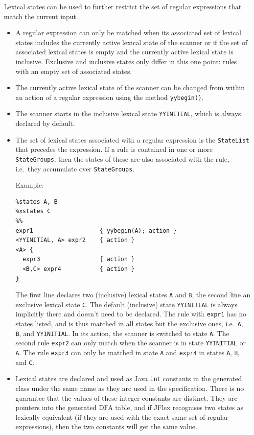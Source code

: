 Lexical states can be used to further restrict the set of regular
expressions that match the current input.

\begin{itemize}
\item
  A regular expression can only be matched when its associated set of
  lexical states includes the currently active lexical state of the
  scanner or if the set of associated lexical states is empty and the
  currently active lexical state is inclusive. Exclusive and inclusive
  states only differ in this one point: rules with an empty set of
  associated states.
\item
  The currently active lexical state of the scanner can be changed from
  within an action of a regular expression using the method
  \texttt{yybegin()}.
\item
  The scanner starts in the inclusive lexical state \texttt{YYINITIAL},
  which is always declared by default.
\item
  The set of lexical states associated with a regular expression is the
  \texttt{StateList} that precedes the expression. If a rule is
  contained in one or more \texttt{StateGroups}, then the states of
  these are also associated with the rule, i.e.~they accumulate over
  \texttt{StateGroups}.

  Example:

\begin{verbatim}
%states A, B
%xstates C
%%
expr1                   { yybegin(A); action }
<YYINITIAL, A> expr2    { action }
<A> {
  expr3                 { action }
  <B,C> expr4           { action }
}
\end{verbatim}

  The first line declares two (inclusive) lexical states \texttt{A} and
  \texttt{B}, the second line an exclusive lexical state \texttt{C}. The
  default (inclusive) state \texttt{YYINITIAL} is always implicitly
  there and doesn't need to be declared. The rule with \texttt{expr1}
  has no states listed, and is thus matched in all states but the
  exclusive ones, i.e.~\texttt{A}, \texttt{B}, and \texttt{YYINITIAL}.
  In its action, the scanner is switched to state \texttt{A}. The second
  rule \texttt{expr2} can only match when the scanner is in state
  \texttt{YYINITIAL} or \texttt{A}. The rule \texttt{expr3} can only be
  matched in state \texttt{A} and \texttt{expr4} in states \texttt{A},
  \texttt{B}, and \texttt{C}.
\item
  Lexical states are declared and used as Java \texttt{int} constants in
  the generated class under the same name as they are used in the
  specification. There is no guarantee that the values of these integer
  constants are distinct. They are pointers into the generated DFA
  table, and if JFlex recognises two states as lexically equivalent (if
  they are used with the exact same set of regular expressions), then
  the two constants will get the same value.
\end{itemize}


